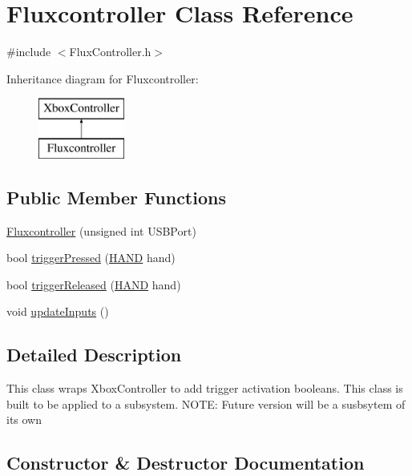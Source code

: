 \hypertarget{classFluxcontroller}{}\section{Fluxcontroller Class Reference}
\label{classFluxcontroller}


{\ttfamily \#include $<$Flux\+Controller.\+h$>$}

Inheritance diagram for Fluxcontroller\+:\begin{figure}[H]
\begin{center}
\leavevmode
\includegraphics[height=2.000000cm]{classFluxcontroller}
\end{center}
\end{figure}
\subsection*{Public Member Functions}
\begin{DoxyCompactItemize}
\item 
\hyperlink{classFluxcontroller_a1451c531fa6e91f5a1a34b7d06286846}{Fluxcontroller} (unsigned int U\+S\+B\+Port)
\item 
bool \hyperlink{classFluxcontroller_a4d561daf0111359a6a1361be49cdf7dd}{trigger\+Pressed} (\hyperlink{FluxController_8h_a899b1f99e0792573e6e4b51d84f78653}{H\+A\+ND} hand)
\item 
bool \hyperlink{classFluxcontroller_a67883b472160e2b316ba96685cecd925}{trigger\+Released} (\hyperlink{FluxController_8h_a899b1f99e0792573e6e4b51d84f78653}{H\+A\+ND} hand)
\item 
void \hyperlink{classFluxcontroller_a70817ff24cbaf6029c69e5213b0bae90}{update\+Inputs} ()
\end{DoxyCompactItemize}


\subsection{Detailed Description}
This class wraps Xbox\+Controller to add trigger activation booleans. This class is built to be applied to a subsystem. N\+O\+TE\+: Future version will be a susbsytem of it\textquotesingle{}s own 

\subsection{Constructor \& Destructor Documentation}
\mbox{\label{classFluxcontroller_a1451c531fa6e91f5a1a34b7d06286846}} 
